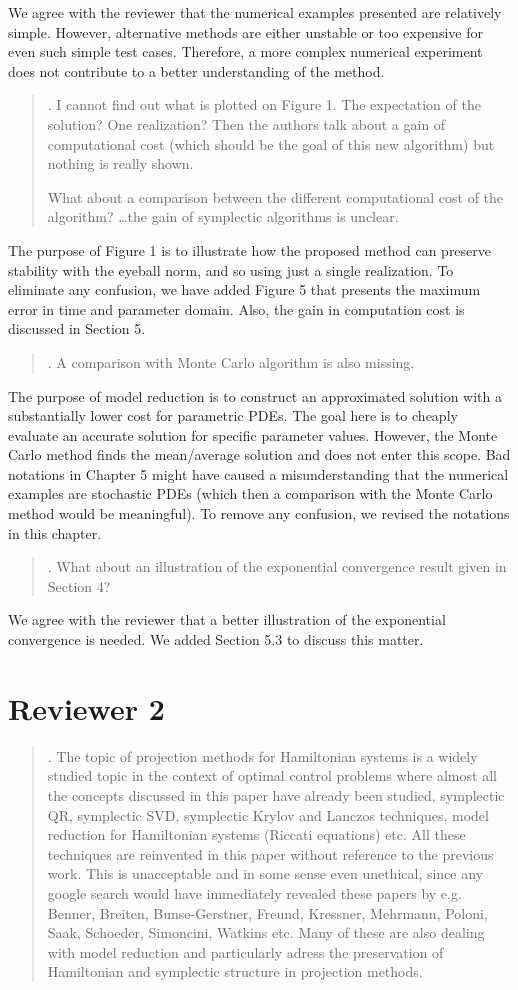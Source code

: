 \documentclass[a4paper]{article}
\newcommand{\breview}{\begin{quotation}\begin{bf}\noindent}
\newcommand{\ereview}{\end{bf}\end{quotation}}
\begin{document}
We agree with the reviewer that the numerical examples presented are relatively simple. However, alternative methods are either unstable or too expensive for even such simple test cases. Therefore, a more complex numerical experiment does not contribute to a better understanding of the method. 


\breview
4. I cannot find out what is plotted on Figure 1. The expectation of the solution? One realization? Then the authors talk about a gain of computational cost (which should be the goal of this new algorithm) but nothing is really shown. 

What about a comparison between the different computational cost of the algorithm? \dots the gain of symplectic algorithms is unclear. 
\ereview

The purpose of Figure 1 is to illustrate how the proposed method can preserve stability with the eyeball norm, and so using just a single realization. To eliminate any confusion, we have added Figure 5 that presents the maximum error in time and parameter domain. Also, the gain in computation cost is discussed in Section 5.

\breview
5. A comparison with Monte Carlo algorithm is also missing.  
\ereview

The purpose of model reduction is to construct an approximated solution with a substantially lower cost for parametric PDEs. The goal here is to cheaply evaluate an accurate solution for specific parameter values. However, the Monte Carlo method finds the mean/average solution and does not enter this scope. Bad notations in Chapter 5 might have caused a misunderstanding that the numerical examples are stochastic PDEs (which then a comparison with the Monte Carlo method would be meaningful). To remove any confusion, we revised the notations in this chapter.

\breview
6. What about an illustration of the exponential convergence result given in Section 4? 
\ereview

We agree with the reviewer that a better illustration of the exponential convergence is needed. We added Section 5.3 to discuss this matter.

\section*{Reviewer 2}

\breview
1. The topic of projection methods for Hamiltonian systems is a widely studied topic in the context of optimal control problems where almost all the concepts discussed in this paper have already been studied, symplectic QR, symplectic SVD, symplectic Krylov and Lanczos techniques, model reduction for Hamiltonian systems (Riccati equations) etc. All these techniques are reinvented in this paper without reference to the previous work. This is unacceptable and in some sense even unethical, since any google search would have immediately revealed these papers by e.g. Benner, Breiten, Bunse-Gerstner, Freund, Kressner, Mehrmann, Poloni, Saak, Schoeder, Simoncini, Watkins etc. Many of these are also dealing with model reduction and particularly adress the preservation of Hamiltonian and symplectic structure in projection methods.
\ereview
\end{document}
